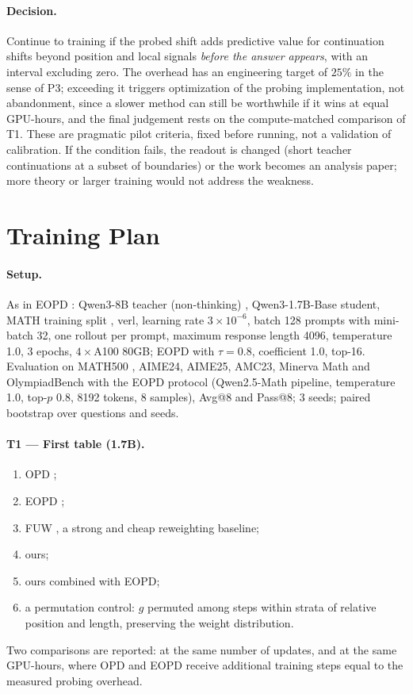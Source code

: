 \documentclass[11pt]{article}
\theoremstyle{definition}
\theoremstyle{remark}
\begin{document}
\paragraph{Decision.}
Continue to training if the probed shift adds predictive value for continuation shifts beyond position and local signals \emph{before the answer appears}, with an interval excluding zero. The overhead has an engineering target of $25\%$ in the sense of P3; exceeding it triggers optimization of the probing implementation, not abandonment, since a slower method can still be worthwhile if it wins at equal GPU-hours, and the final judgement rests on the compute-matched comparison of T1. These are pragmatic pilot criteria, fixed before running, not a validation of calibration. If the condition fails, the readout is changed (short teacher continuations at a subset of boundaries) or the work becomes an analysis paper; more theory or larger training would not address the weakness.

\section{Training Plan}
\label{sec:training}

\paragraph{Setup.}
As in EOPD \citep{jin2026eopd}: Qwen3-8B teacher (non-thinking) \citep{yang2025qwen3}, Qwen3-1.7B-Base student, MATH training split \citep{hendrycks2021math}, verl, learning rate $3\times10^{-6}$, batch 128 prompts with mini-batch 32, one rollout per prompt, maximum response length 4096, temperature 1.0, 3 epochs, $4\times$A100 80GB; EOPD with $\tau=0.8$, coefficient 1.0, top-16. Evaluation on MATH500 \citep{lightman2024verify}, AIME24, AIME25, AMC23, Minerva Math \citep{lewkowycz2022minerva} and OlympiadBench \citep{he2024olympiadbench} with the EOPD protocol (Qwen2.5-Math pipeline, temperature 1.0, top-$p$ 0.8, 8192 tokens, 8 samples), Avg@8 and Pass@8; 3 seeds; paired bootstrap over questions and seeds.

\paragraph{T1 --- First table (1.7B).}
\begin{enumerate}[itemsep=1pt]
\item OPD \citep{lu2025opd};
\item EOPD \citep{jin2026eopd};
\item FUW \citep{fuw2026}, a strong and cheap reweighting baseline;
\item ours;
\item ours combined with EOPD;
\item a permutation control: $g$ permuted among steps within strata of relative position and length, preserving the weight distribution.
\end{enumerate}
Two comparisons are reported: at the same number of updates, and at the same GPU-hours, where OPD and EOPD receive additional training steps equal to the measured probing overhead.
\end{document}
